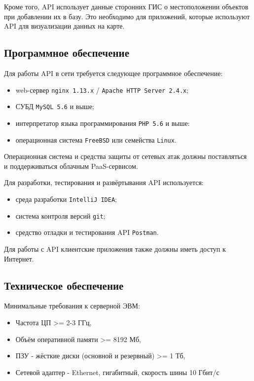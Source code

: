 	Кроме того, API использует данные сторонних ГИС о местоположении объектов при добавлении их в базу. Это необходимо для приложений, которые используют API для визуализации данных на карте.

\subsection{\enskip Программное обеспечение}

\par

	Для работы API в сети требуется следующее программное обеспечение:

	\begin{itemize}
		\item web-сервер \texttt{nginx 1.13.x} / \texttt{Apache HTTP Server 2.4.x};
		\item СУБД \texttt{MySQL 5.6} и выше;
		\item интерпретатор языка программирования \texttt{PHP 5.6} и выше:
		\item операционная система \texttt{FreeBSD} или семейства \texttt{Linux}.
	\end{itemize}
	
	Операционная система и средства защиты от сетевых атак должны поставляться и поддерживаться облачным PaaS-сервисом.
	
\par
	Для разработки, тестирования и развёртывания API используется:

	\begin{itemize}
		\item среда разработки \texttt{IntelliJ IDEA};
		\item система контроля версий \texttt{git};
		\item средство отладки и тестирования API \texttt{Postman}.
	\end{itemize}
 
	Для работы с API клиентские приложения также должны иметь доступ к Интернет.

\subsection{\enskip Техническое обеспечение}

\par

	Минимальные требования к серверной ЭВМ:

	\begin{itemize}
		\item Частота ЦП >= 2-3 ГГц, 
		\item Объём оперативной памяти >= 8192 Мб,
		\item ПЗУ - жёсткие диски (основной и резервный) >= 1 Тб,
		\item Сетевой адаптер - Ethernet, гигабитный, скорость шины 10 Гбит/с
	\end{itemize}

